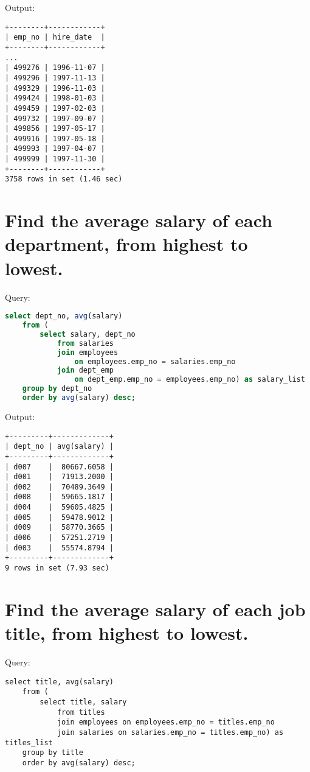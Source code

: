 \documentclass[12pt]{article}
\begin{document}
Output:

\begin{verbatim}
+--------+------------+
| emp_no | hire_date  |
+--------+------------+
...
| 499276 | 1996-11-07 |
| 499296 | 1997-11-13 |
| 499329 | 1996-11-03 |
| 499424 | 1998-01-03 |
| 499459 | 1997-02-03 |
| 499732 | 1997-09-07 |
| 499856 | 1997-05-17 |
| 499916 | 1997-05-18 |
| 499993 | 1997-04-07 |
| 499999 | 1997-11-30 |
+--------+------------+
3758 rows in set (1.46 sec)
\end{verbatim}


\section{Find the average salary of each department, from highest to lowest.}

Query:

\begin{lstlisting}[language=SQL]
select dept_no, avg(salary)
    from (
        select salary, dept_no
            from salaries
            join employees
                on employees.emp_no = salaries.emp_no
            join dept_emp
                on dept_emp.emp_no = employees.emp_no) as salary_list
    group by dept_no
    order by avg(salary) desc;
\end{lstlisting}

Output:

\begin{verbatim}
+---------+-------------+
| dept_no | avg(salary) |
+---------+-------------+
| d007    |  80667.6058 |
| d001    |  71913.2000 |
| d002    |  70489.3649 |
| d008    |  59665.1817 |
| d004    |  59605.4825 |
| d005    |  59478.9012 |
| d009    |  58770.3665 |
| d006    |  57251.2719 |
| d003    |  55574.8794 |
+---------+-------------+
9 rows in set (7.93 sec)
\end{verbatim}


\section{Find the average salary of each job title, from highest to lowest.}

Query:

\begin{verbatim}
select title, avg(salary)
    from (
        select title, salary
            from titles
            join employees on employees.emp_no = titles.emp_no
            join salaries on salaries.emp_no = titles.emp_no) as titles_list
    group by title
    order by avg(salary) desc;
\end{verbatim}
\end{document}
